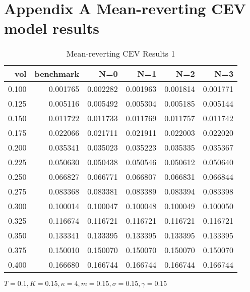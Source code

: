\chapter{Appendix A Mean-reverting CEV model results}
\label{mrcev}

\begin{table}[ht]
  \centering
  \caption{Mean-reverting CEV Results 1}
  \begin{tabular}{rrrrrr}
  \toprule
    vol &       benchmark &       N=0 &       N=1 &       N=2 &       N=3 \\
  \midrule
  0.100 & 0.001765 & 0.002282 & 0.001963 & 0.001814 & 0.001771 \\
  0.125 & 0.005116 & 0.005492 & 0.005304 & 0.005185 & 0.005144 \\
  0.150 & 0.011722 & 0.011733 & 0.011769 & 0.011757 & 0.011742 \\
  0.175 & 0.022066 & 0.021711 & 0.021911 & 0.022003 & 0.022020 \\
  0.200 & 0.035341 & 0.035023 & 0.035223 & 0.035335 & 0.035367 \\
  0.225 & 0.050630 & 0.050438 & 0.050546 & 0.050612 & 0.050640 \\
  0.250 & 0.066827 & 0.066771 & 0.066807 & 0.066831 & 0.066844 \\
  0.275 & 0.083368 & 0.083381 & 0.083389 & 0.083394 & 0.083398 \\
  0.300 & 0.100014 & 0.100047 & 0.100048 & 0.100049 & 0.100050 \\
  0.325 & 0.116674 & 0.116721 & 0.116721 & 0.116721 & 0.116721 \\
  0.350 & 0.133341 & 0.133395 & 0.133395 & 0.133395 & 0.133395 \\
  0.375 & 0.150010 & 0.150070 & 0.150070 & 0.150070 & 0.150070 \\
  0.400 & 0.166680 & 0.166744 & 0.166744 & 0.166744 & 0.166744 \\
  \bottomrule
  \end{tabular}
  \small{$T=0.1,K=0.15, \kappa =  4,m=0.15, \sigma =0.15, \gamma = 0.15$}
  \end{table}

